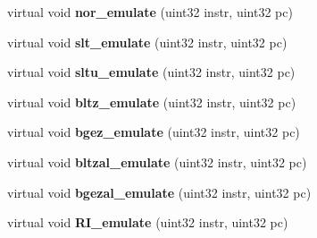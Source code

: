 \begin{DoxyCompactItemize}
\item 
\hypertarget{classCPU_a083835bce0c15e35ca834d0a0ecf2d22}{
virtual void {\bfseries nor\_\-emulate} (uint32 instr, uint32 pc)}
\label{classCPU_a083835bce0c15e35ca834d0a0ecf2d22}

\item 
\hypertarget{classCPU_a559d3f67d5b4119fe3fd595132a5185e}{
virtual void {\bfseries slt\_\-emulate} (uint32 instr, uint32 pc)}
\label{classCPU_a559d3f67d5b4119fe3fd595132a5185e}

\item 
\hypertarget{classCPU_ab96315f07f7fa574462e490bfdcfab3a}{
virtual void {\bfseries sltu\_\-emulate} (uint32 instr, uint32 pc)}
\label{classCPU_ab96315f07f7fa574462e490bfdcfab3a}

\item 
\hypertarget{classCPU_a646c50f8a1c19a8969417b746006a858}{
virtual void {\bfseries bltz\_\-emulate} (uint32 instr, uint32 pc)}
\label{classCPU_a646c50f8a1c19a8969417b746006a858}

\item 
\hypertarget{classCPU_a2a254799bd1e3545a1ec4d0cb65bb46e}{
virtual void {\bfseries bgez\_\-emulate} (uint32 instr, uint32 pc)}
\label{classCPU_a2a254799bd1e3545a1ec4d0cb65bb46e}

\item 
\hypertarget{classCPU_aff3e31b1a382ffc29f1ac7ba522735d8}{
virtual void {\bfseries bltzal\_\-emulate} (uint32 instr, uint32 pc)}
\label{classCPU_aff3e31b1a382ffc29f1ac7ba522735d8}

\item 
\hypertarget{classCPU_a14fa3b5c3dd0d71e36a71d7d3615cac9}{
virtual void {\bfseries bgezal\_\-emulate} (uint32 instr, uint32 pc)}
\label{classCPU_a14fa3b5c3dd0d71e36a71d7d3615cac9}

\item 
\hypertarget{classCPU_a2220cac151f1745874a46eed35761ddb}{
virtual void {\bfseries RI\_\-emulate} (uint32 instr, uint32 pc)}
\label{classCPU_a2220cac151f1745874a46eed35761ddb}

\end{DoxyCompactItemize}
